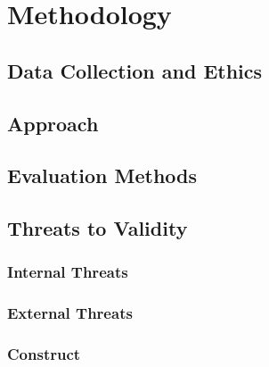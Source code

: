 \chapter{Methodology}

\section{Data Collection and Ethics}

\section{Approach}

\section{Evaluation Methods}

\section{Threats to Validity}

\subsection{Internal Threats}

\subsection{External Threats}

\subsection{Construct}